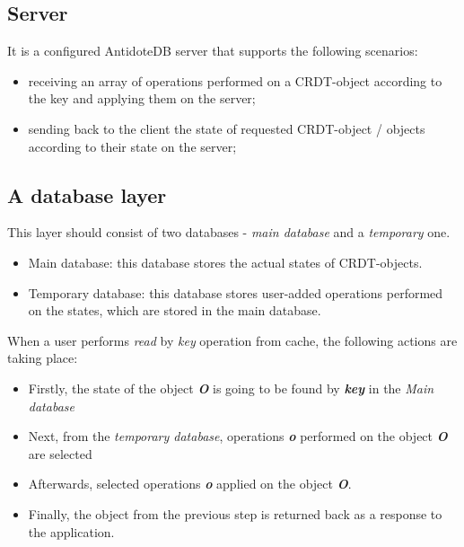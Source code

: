\subsection*{Server}

It is a configured AntidoteDB server that supports the following scenarios:

\begin{itemize}
    \item receiving an array of operations performed on a CRDT-object according to the key and applying them on the server;
    \item sending back to the client the state of requested CRDT-object / objects according to their state on the server;
\end{itemize}

\subsection*{A database layer}

This layer should consist of two databases - \textit{main database} and a \textit{temporary} one.

\begin{itemize}
	\item Main database: this database stores the actual states of CRDT-objects.
	\item Temporary database: this database stores user-added operations performed on the states, which are stored in the main database.
\end{itemize}

When a user performs \textit{read} by \textit{key} operation from cache, the following actions are taking place:

\begin{itemize}
\item Firstly, the state of the object \textit{\textbf{O}} is going to be found by \textit{\textbf{key}} in the \textit{Main database}
\item Next, from the \textit{temporary database}, operations \textit{\textbf{o}} performed on the object \textit{\textbf{O}} are selected
\item Afterwards, selected operations \textit{\textbf{o}} applied on the object \textit{\textbf{O}}.
\item Finally, the object from the previous step is returned back as a response to the application.
\end{itemize} 

